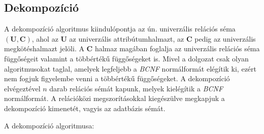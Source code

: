 \subsection{Dekompozíció}

A dekompozíció algoritmus kiindulópontja az ún. univerzális relációs séma $(\textbf{U},\textbf{C})$, ahol az $\textbf{U}$ az univerzális attribútumhalmazt, az $\textbf{C}$ pedig az univerzális megkötéshalmazt jelöli. A $\textbf{C}$ halmaz magában foglalja az univerzális relációs séma függőségeit valamint a többértékű függőségeket is. Mivel a dolgozat csak olyan algoritmusokat taglal, amelyek legfeljebb a \textit{BCNF} normálformát elégítik ki, ezért nem fogjuk figyelembe venni a többértékű függőségeket. A dekompozíció elvégeztével $n$ darab relációs sémát kapunk, melyek kielégítik a \textit{BCNF} normálformát. A relációközi megszorításokkal kiegészülve megkapjuk a dekompozíció kimenetét, vagyis az adatbázis sémát.

A dekompozíció algoritmusa:

